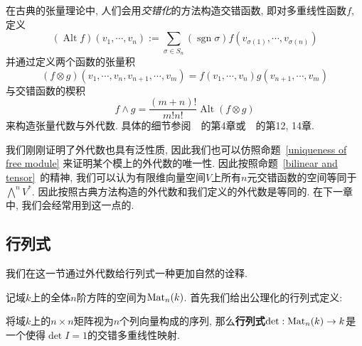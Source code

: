 \begin{rem}
    在古典的张量理论中, 人们会用\textit{交错化}的方法构造交错函数, 即对多重线性函数$f$, 定义
    \[(\operatorname{Alt}f)(v_1,\cdots,v_n):=\sum_{\sigma\in S_n}(\operatorname{sgn}{\sigma})f(v_{\sigma(1)},\cdots,v_{\sigma(n)})\]
    并通过定义两个函数的张量积
    \[(f\otimes g)(v_1,\cdots,v_n,v_{n+1},\cdots,v_m)=f(v_1,\cdots,v_n)g(v_{n+1},\cdots,v_m)\]
    与交错函数的楔积
    \[f\wedge g=\frac{(m+n)!}{m!n!}\operatorname{Alt}(f\otimes g)\]
    来构造张量代数与外代数.
    具体的细节参阅~\parencite{Spivak_CalMani}~的第4章或~\parencite{Lee_IntroSmMani}~的第12, 14章.

    我们刚刚证明了外代数也具有泛性质, 因此我们也可以仿照命题~\ref{uniqueness of free module} 来证明某个模上的外代数的唯一性.
    因此按照命题~\ref{bilinear and tensor}~的精神,
    我们可以认为有限维向量空间$V$上所有$n$元交错函数的空间等同于$\displaystyle\bigwedge\nolimits^n V^*$.
    因此按照古典方法构造的外代数和我们定义的外代数是等同的.
    在下一章中, 我们会经常用到这一点的.
\end{rem}

\subsection*{行列式}
我们在这一节通过外代数给行列式一种更加自然的诠释.

记域$k$上的全体$n$阶方阵的空间为$\operatorname{Mat}_n(k)$.
首先我们给出公理化的行列式定义:
\begin{defn}
    将域$k$上的$n\times n$矩阵视为$n$个列向量构成的序列, 那么\textbf{行列式}$\det:\operatorname{Mat}_n(k)\to k$是一个使得$\det I=1$的交错多重线性映射.
\end{defn}

